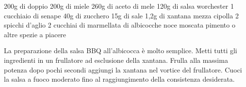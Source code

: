 \label{salsa-bbq}
\serves{-}
\begin{ingreds}
	200g di doppio 
	200g di miele
	260g di aceto di mele
	120g di salsa worchester
	1 cucchiaio di senape
	40g di zucchero
	15g di sale
	1,2g di xantana
	mezza cipolla
	2 spicchi d'aglio
	2 cucchiai di marmellata di albicocche
	noce moscata
	pimento o altre spezie a piacere

\end{ingreds}

\begin{method}
La preparazione della salsa BBQ all'albicocca è molto semplice. Metti tutti gli ingredienti in un frullatore ad esclusione della xantana. Frulla alla massima potenza dopo pochi secondi aggiungi la xantana nel vortice del frullatore.
Cuoci la salsa a fuoco moderato fino al raggiungimento della consistenza desiderata.
\end{method}



